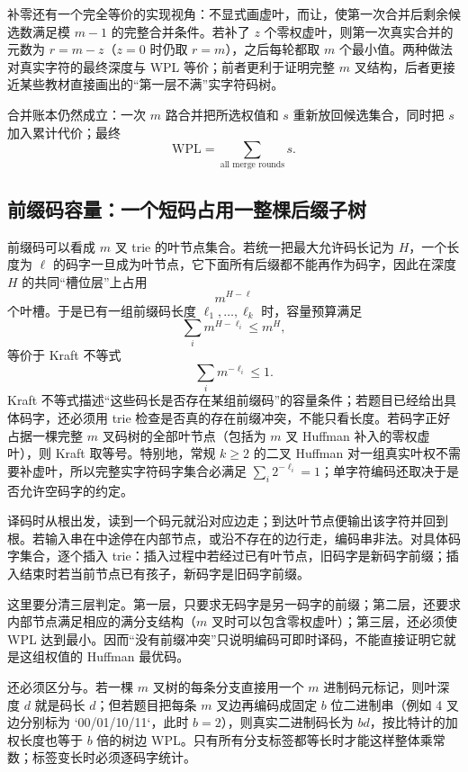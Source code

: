 \documentclass[UTF8,fontset=none,11pt,a4paper]{ctexart}
\begin{document}
补零还有一个完全等价的实现视角：不显式画虚叶，而让，使第一次合并后剩余候选数满足模 $m-1$ 的完整合并条件。若补了 $z$ 个零权虚叶，则第一次真实合并的元数为 $r=m-z$（$z=0$ 时仍取 $r=m$），之后每轮都取 $m$ 个最小值。两种做法对真实字符的最终深度与 WPL 等价；前者更利于证明完整 $m$ 叉结构，后者更接近某些教材直接画出的“第一层不满”实字符码树。

合并账本仍然成立：一次 $m$ 路合并把所选权值和 $s$ 重新放回候选集合，同时把 $s$ 加入累计代价；最终
\[
\boxed{\mathrm{WPL}=\sum_{\text{all merge rounds}} s}.
\]

\subsection{前缀码容量：一个短码占用一整棵后缀子树}
前缀码可以看成 $m$ 叉 trie 的叶节点集合。若统一把最大允许码长记为 $H$，一个长度为 $\ell$ 的码字一旦成为叶节点，它下面所有后缀都不能再作为码字，因此在深度 $H$ 的共同“槽位层”上占用
\[
m^{H-\ell}
\]
个叶槽。于是已有一组前缀码长度 $\ell_1,\ldots,\ell_k$ 时，容量预算满足
\[
\sum_i m^{H-\ell_i}\le m^H,
\]
等价于 Kraft 不等式
\[
\boxed{\sum_i m^{-\ell_i}\le1}.
\]
Kraft 不等式描述“这些码长是否存在某组前缀码”的容量条件；若题目已经给出具体码字，还必须用 trie 检查是否真的存在前缀冲突，不能只看长度。若码字正好占据一棵完整 $m$ 叉码树的全部叶节点（包括为 $m$ 叉 Huffman 补入的零权虚叶），则 Kraft 取等号。特别地，常规 $k\ge2$ 的二叉 Huffman 对一组真实叶权不需要补虚叶，所以完整实字符码字集合必满足 $\sum_i2^{-\ell_i}=1$；单字符编码还取决于是否允许空码字的约定。

译码时从根出发，读到一个码元就沿对应边走；到达叶节点便输出该字符并回到根。若输入串在中途停在内部节点，或沿不存在的边行走，编码串非法。对具体码字集合，逐个插入 trie：插入过程中若经过已有叶节点，旧码字是新码字前缀；插入结束时若当前节点已有孩子，新码字是旧码字前缀。

这里要分清三层判定。第一层，只要求无码字是另一码字的前缀；第二层，还要求内部节点满足相应的满分支结构（$m$ 叉时可以包含零权虚叶）；第三层，还必须使 WPL 达到最小。因而“没有前缀冲突”只说明编码可即时译码，不能直接证明它就是这组权值的 Huffman 最优码。

还必须区分与。若一棵 $m$ 叉树的每条分支直接用一个 $m$ 进制码元标记，则叶深度 $d$ 就是码长 $d$；但若题目把每条 $m$ 叉边再编码成固定 $b$ 位二进制串（例如 4 叉边分别标为 `00/01/10/11`，此时 $b=2$），则真实二进制码长为 $bd$，按比特计的加权长度也等于 $b$ 倍的树边 WPL。只有所有分支标签都等长时才能这样整体乘常数；标签变长时必须逐码字统计。
\end{document}
